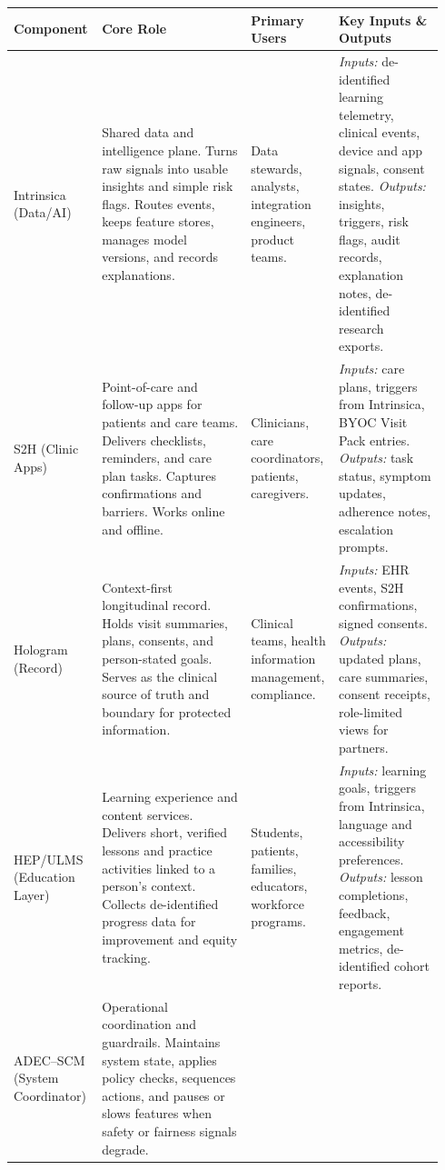 \documentclass[12pt]{article}
\begin{document}
\begin{longtable}{@{}p{0.18\linewidth}p{0.34\linewidth}p{0.18\linewidth}p{0.24\linewidth}@{}}
\toprule
\textbf{Component} & \textbf{Core Role} & \textbf{Primary Users} & \textbf{Key Inputs \& Outputs} \\
\midrule
\endhead
Intrinsica (Data/AI) &
Shared data and intelligence plane. Turns raw signals into usable insights and simple risk flags. Routes events, keeps feature stores, manages model versions, and records explanations. &
Data stewards, analysts, integration engineers, product teams. &
\emph{Inputs:} de-identified learning telemetry, clinical events, device and app signals, consent states. \newline
\emph{Outputs:} insights, triggers, risk flags, audit records, explanation notes, de-identified research exports. \\
\addlinespace
S2H (Clinic Apps) &
Point-of-care and follow-up apps for patients and care teams. Delivers checklists, reminders, and care plan tasks. Captures confirmations and barriers. Works online and offline. &
Clinicians, care coordinators, patients, caregivers. &
\emph{Inputs:} care plans, triggers from Intrinsica, BYOC Visit Pack entries. \newline
\emph{Outputs:} task status, symptom updates, adherence notes, escalation prompts. \\
\addlinespace
Hologram (Record) &
Context-first longitudinal record. Holds visit summaries, plans, consents, and person-stated goals. Serves as the clinical source of truth and boundary for protected information. &
Clinical teams, health information management, compliance. &
\emph{Inputs:} EHR events, S2H confirmations, signed consents. \newline
\emph{Outputs:} updated plans, care summaries, consent receipts, role-limited views for partners. \\
\addlinespace
HEP/ULMS (Education Layer) &
Learning experience and content services. Delivers short, verified lessons and practice activities linked to a person’s context. Collects de-identified progress data for improvement and equity tracking. &
Students, patients, families, educators, workforce programs. &
\emph{Inputs:} learning goals, triggers from Intrinsica, language and accessibility preferences. \newline
\emph{Outputs:} lesson completions, feedback, engagement metrics, de-identified cohort reports. \\
\addlinespace
ADEC–SCM (System Coordinator) &
Operational coordination and guardrails. Maintains system state, applies policy checks, sequences actions, and pauses or slows features when safety or fairness signals degrade. &

\end{longtable}
\end{document}
